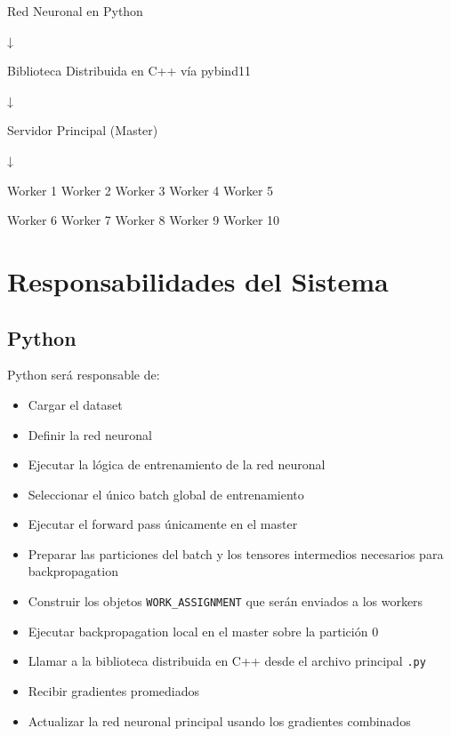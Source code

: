 \documentclass[12pt]{article}
\begin{document}
\begin{center}
Red Neuronal en Python

↓

Biblioteca Distribuida en C++ vía pybind11

↓

Servidor Principal (Master)

↓

Worker 1 \hspace{0.4cm} Worker 2 \hspace{0.4cm} Worker 3 \hspace{0.4cm} Worker 4 \hspace{0.4cm} Worker 5

Worker 6 \hspace{0.4cm} Worker 7 \hspace{0.4cm} Worker 8 \hspace{0.4cm} Worker 9 \hspace{0.4cm} Worker 10
\end{center}


\section{Responsabilidades del Sistema}

\subsection{Python}

Python será responsable de:

\begin{itemize}
\item Cargar el dataset
\item Definir la red neuronal
\item Ejecutar la lógica de entrenamiento de la red neuronal
\item Seleccionar el único batch global de entrenamiento
\item Ejecutar el forward pass únicamente en el master
\item Preparar las particiones del batch y los tensores intermedios necesarios para backpropagation
\item Construir los objetos \texttt{WORK\_ASSIGNMENT} que serán enviados a los workers
\item Ejecutar backpropagation local en el master sobre la partición 0
\item Llamar a la biblioteca distribuida en C++ desde el archivo principal \texttt{.py}
\item Recibir gradientes promediados
\item Actualizar la red neuronal principal usando los gradientes combinados
\end{itemize}
\end{document}
